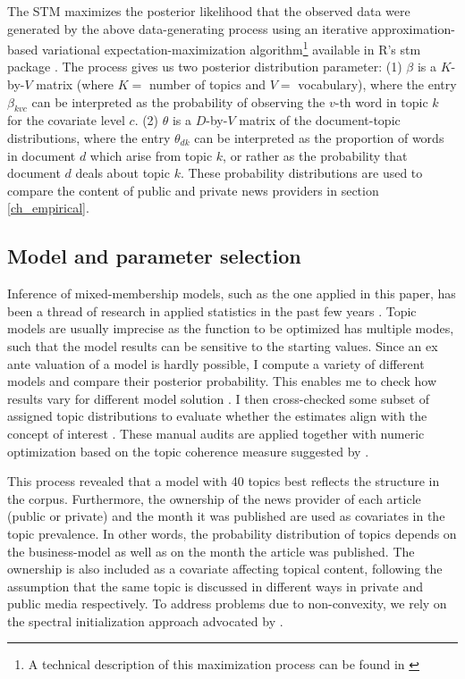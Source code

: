 \documentclass[12pt,a4paper,notitlepage]{article}
\begin{document}
The STM maximizes the posterior likelihood that the observed data were generated by the above data-generating process using an iterative approximation-based variational expectation-maximization algorithm\footnote{A technical description of this maximization process can be found in \citet{roberts_model_2016}} available in R's stm package \citep{roberts_stm:_2016}. The process gives us two posterior distribution parameter: (1) $\beta$ is a $K$-by-$V$ matrix (where $K=$ number of topics and $V=$ vocabulary), where the entry $\beta_{kvc}$ can be interpreted as the probability of observing the $v$-th word in topic $k$ for the covariate level $c$. (2) $\theta$ is a $D$-by-$V$ matrix of the document-topic distributions, where the entry $\theta_{dk}$ can be interpreted as the proportion of words in document $d$ which arise from topic $k$, or rather as the probability that document $d$ deals about topic $k$. These probability distributions are used to compare the content of public and private news providers in section \ref{ch_empirical}.


\subsection{Model and parameter selection}

Inference of mixed-membership models, such as the one applied in this paper, has been a thread of research in applied statistics in the past few years \citep{blei_latent_2003} \citep{erosheva_mixed-membership_2004} \citep{braun_variational_2010}. Topic models are usually imprecise as the function to be optimized has multiple modes, such that the model results can be sensitive to the starting values. Since an ex ante valuation of a model is hardly possible, I compute a variety of different models and compare their posterior probability. This enables me to check how results vary for different model solution \citep{roberts_navigating_2016}. I then cross-checked some subset of assigned topic distributions to evaluate whether the estimates align with the concept of interest \citep{gentzkow_text_2017}. These manual audits are applied together with numeric optimization based on the topic coherence measure suggested by \citet{mimno_optimizing_2011}. 

This process revealed that a model with 40 topics best reflects the structure in the corpus. Furthermore, the ownership of the news provider of each article (public or private) and the month it was published are used as covariates in the topic prevalence. In other words, the probability distribution of topics depends on the business-model as well as on the month the article was published. The ownership is also included as a covariate affecting topical content, following the assumption that the same topic is discussed in different ways in private and public media respectively. To address problems due to non-convexity, we rely on the spectral initialization approach advocated by \citet{roberts_navigating_2016}. 
\end{document}
